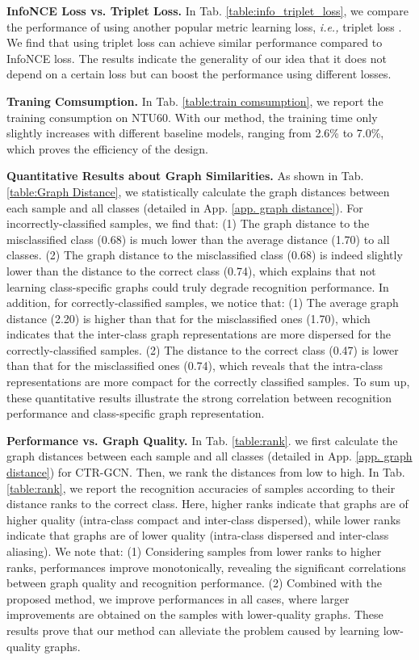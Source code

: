 \documentclass{article} \usepackage{iclr2023_conference,times}
\begin{document}
\noindent \textbf{InfoNCE Loss vs. Triplet Loss.}
In Tab. \ref{table:info_triplet_loss}, we compare the performance of using another popular metric learning loss, \emph{i.e.,} triplet loss \citep{triplet}. We find that using triplet loss can achieve similar performance compared to InfoNCE loss. The results indicate the generality of our idea that it does not depend on a certain loss but can boost the performance using different losses.

\noindent \textbf{Traning Comsumption.}
In Tab. \ref{table:train comsumption}, we report the training consumption on NTU60. With our method, the training time only slightly increases with different baseline models, ranging from 2.6\% to 7.0\%, which proves the efficiency of the design. 

\noindent \textbf{Quantitative Results about Graph Similarities.} As shown in Tab. \ref{table:Graph Distance}, we statistically calculate the graph distances between each sample and all classes (detailed in App. \ref{app. graph distance}). For incorrectly-classified samples, we find that: (1) The graph distance to the misclassified class (0.68) is much lower than the average distance (1.70) to all classes. (2) The graph distance to the misclassified class (0.68) is indeed slightly lower than the distance to the correct class (0.74), which explains that not learning class-specific graphs could truly degrade recognition performance. In addition, for correctly-classified samples, we notice that: (1) The average graph distance (2.20) is higher than that for the misclassified ones (1.70), which indicates that the inter-class graph representations are more dispersed for the correctly-classified samples. (2) The distance to the correct class (0.47) is lower than that for the misclassified ones (0.74), which reveals that the intra-class representations are more compact for the correctly classified samples. To sum up, these quantitative results illustrate the strong correlation between recognition performance and class-specific graph representation.

\noindent \textbf{Performance vs. Graph Quality.} In Tab. \ref{table:rank}. we first calculate the graph distances between each sample and all classes (detailed in App. \ref{app. graph distance}) for CTR-GCN. Then, we rank the distances from low to high. In Tab. \ref{table:rank}, we report the recognition accuracies of samples according to their distance ranks to the correct class. Here, higher ranks indicate that graphs are of higher quality (intra-class compact and inter-class dispersed), while lower ranks indicate that graphs are of lower quality (intra-class dispersed and inter-class aliasing). We note that: (1) Considering samples from lower ranks to higher ranks, performances improve monotonically, revealing the significant correlations between graph quality and recognition performance. (2) Combined with the proposed method, we improve performances in all cases, where larger improvements are obtained on the samples with lower-quality graphs. These results prove that our method can alleviate the problem caused by learning low-quality graphs.
\end{document}
